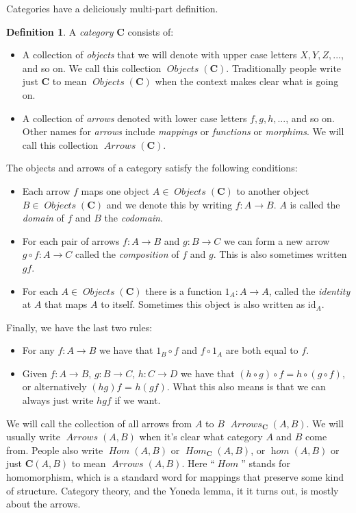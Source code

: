 \documentclass[12pt]{article}
\theoremstyle{definition}
\theoremstyle{definition}
\newtheorem{defn}{Definition}[]
\theoremstyle{definition}
\numberwithin{equation}{section}
\newcommand{\cat}[1]{\mathbf{#1}}      %
\newcommand{\id}{\mathrm{id}} %
\newcommand{\CC}{\cat{C}}
\DeclareMathOperator{\Arrows}{\mathit{Arrows}}
\DeclareMathOperator{\Objects}{\mathit{Objects}}
\DeclareMathOperator{\Hom}{\mathit{Hom}}
\DeclareMathOperator{\ihom}{\mathit{hom}}
\def\objc{\Objects(\cat{C})}
\def\ni{\goodbreak\noindent}
\begin{document}
Categories have a deliciously multi-part definition.

\begin{defn}
\label{category}
A {\it category} $\CC$ consists of:
%
\begin{itemize}
\item 
A collection of {\it objects} that we will denote with upper case letters $X, Y, Z, ...$,
and so on.  
We call this collection $\objc$. Traditionally people write just $\CC$ to mean $\objc$
when the context makes clear what is going on.
\item
A collection of {\it arrows} denoted with lower case letters $f, g, h, ...$, and so on.
Other names for {\it arrows} include {\it mappings} or {\it functions} or {\it morphims}.
We will call this collection $\Arrows(\CC)$. \end{itemize}%
The objects and arrows of a category satisfy the following conditions:
\begin{itemize}
\item
Each arrow $f$ maps one object $A \in \objc$ to another object $B \in \objc$ and we denote
this by writing $f: A \to B$. $A$ is called the {\it domain} of $f$ and $B$ the {\it
codomain}.
\item
For each pair of arrows $f:A \to B$ and $g : B \to C$ we can form a new arrow $g \circ f:
A \to C$ called the {\it composition} of $f$ and $g$. This is also sometimes written $gf$.
\item
For each $A \in \objc$ there is a function $1_A: A \to A$, called the {\it identity} at
$A$ that maps $A$ to itself. Sometimes this object is also written as $\id_A$.
\end{itemize}
\goodbreak\ni Finally, we have the last two rules:

\begin{itemize}
\item For any $f: A \to B$ we have that $1_B \circ f$ and $f \circ 1_A$ are both equal to
$f$. 
\item Given $f: A \to B$, $g: B \to C$, $h: C\to D$ we have that $(h \circ g) \circ f = h
\circ (g \circ f)$, or alternatively $(hg)f$ = $h(gf)$. What this also means is that we
can always just write $hgf$ if we want. \end{itemize}%
\end{defn}%
\ni
We will call the collection of all arrows from $A$ to $B$ $\Arrows_{\CC}(A, B)$. We will
usually write $\Arrows(A,B)$ when it's clear what category $A$ and $B$ come from. People
also write $\Hom(A, B)$ or $\Hom_{\CC}(A,B)$, or $\ihom(A, B)$ or just $\CC(A,B)$ to mean
$\Arrows(A,B)$. Here ``$\Hom$'' stands for homomorphism, which is a standard word for
mappings that preserve some kind of structure. Category theory, and the Yoneda lemma, it
it turns out, is mostly about the arrows.
\end{document}
